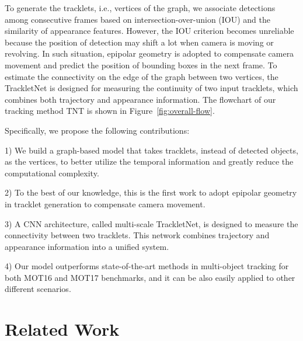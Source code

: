 \documentclass[10pt,twocolumn,letterpaper]{article}
\begin{document}
To generate the tracklets, i.e., vertices of the graph, we associate detections among consecutive frames based on intersection-over-union (IOU) and the similarity of appearance features. However, the IOU criterion becomes unreliable because the position of detection may shift a lot when camera is moving or revolving. In such situation, epipolar geometry is adopted to compensate camera movement and predict the position of bounding boxes in the next frame. 
To estimate the connectivity on the edge of the graph between two vertices, the TrackletNet is designed for measuring the continuity of two input tracklets, which combines both trajectory and appearance information. 
The flowchart of our tracking method TNT is shown in Figure~\ref{fig:overall-flow}.


Specifically, we propose the following contributions:

1) We build a graph-based model that takes tracklets, instead of detected objects, as the vertices, to better utilize the temporal information and greatly reduce the computational complexity.

2) To the best of our knowledge, this is the first work to adopt epipolar geometry in tracklet generation to compensate camera movement. 

3) A CNN architecture, called multi-scale TrackletNet, is designed to measure the connectivity between two tracklets. This network combines trajectory and appearance information into a unified system. 

4) Our model outperforms state-of-the-art methods in multi-object tracking for both MOT16 and MOT17 benchmarks, and it can be also easily applied to other different scenarios.


\section{Related Work}
\end{document}
